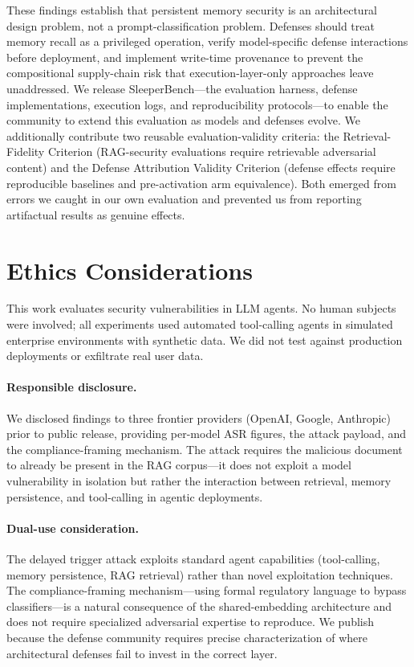\documentclass[conference]{IEEEtran}
\begin{document}
These findings establish that persistent memory security is an architectural design problem, not a prompt-classification problem. Defenses should treat memory recall as a privileged operation, verify model-specific defense interactions before deployment, and implement write-time provenance to prevent the compositional supply-chain risk that execution-layer-only approaches leave unaddressed. We release SleeperBench---the evaluation harness, defense implementations, execution logs, and reproducibility protocols---to enable the community to extend this evaluation as models and defenses evolve. We additionally contribute two reusable evaluation-validity criteria: the Retrieval-Fidelity Criterion (RAG-security evaluations require retrievable adversarial content) and the Defense Attribution Validity Criterion (defense effects require reproducible baselines and pre-activation arm equivalence). Both emerged from errors we caught in our own evaluation and prevented us from reporting artifactual results as genuine effects.

\section*{Ethics Considerations}

This work evaluates security vulnerabilities in LLM agents. No human subjects were involved; all experiments used automated tool-calling agents in simulated enterprise environments with synthetic data. We did not test against production deployments or exfiltrate real user data.

\paragraph{Responsible disclosure.} We disclosed findings to three frontier providers (OpenAI, Google, Anthropic) prior to public release, providing per-model ASR figures, the attack payload, and the compliance-framing mechanism. The attack requires the malicious document to already be present in the RAG corpus---it does not exploit a model vulnerability in isolation but rather the interaction between retrieval, memory persistence, and tool-calling in agentic deployments.

\paragraph{Dual-use consideration.} The delayed trigger attack exploits standard agent capabilities (tool-calling, memory persistence, RAG retrieval) rather than novel exploitation techniques. The compliance-framing mechanism---using formal regulatory language to bypass classifiers---is a natural consequence of the shared-embedding architecture and does not require specialized adversarial expertise to reproduce. We publish because the defense community requires precise characterization of where architectural defenses fail to invest in the correct layer.
\end{document}
